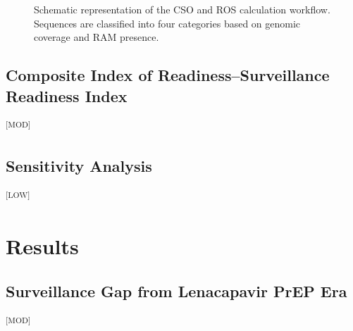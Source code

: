 \documentclass[12pt]{article}
\newcommand{\GradeModerate}{\textsuperscript{\textsf{[MOD]}}}
\newcommand{\GradeLow}{\textsuperscript{\textsf{[LOW]}}}
\begin{document}


\begin{figure}[htbp]
    \centering
    
    \caption[CSO and ROS calculation workflow]{Schematic representation of the
    CSO and ROS calculation workflow. Sequences are classified into four
    categories based on genomic coverage and RAM presence.}\label{fig:cso_ros_workflow}
\end{figure}

\subsection{Composite Index of Readiness--Surveillance Readiness Index}\label{sec:cir_sri}\GradeModerate



\begin{table}[htbp]
    \centering
    \caption{Dimensional framework for the CIR-SRI composite score.}\label{tab:cir_sri_framework}
    
\end{table}

\subsection{Sensitivity Analysis}\label{sec:sensitivity}\GradeLow



\section{Results}\label{sec:results}

\subsection{Surveillance Gap from Lenacapavir PrEP Era}\label{sec:results_gap}\GradeModerate
\end{document}
